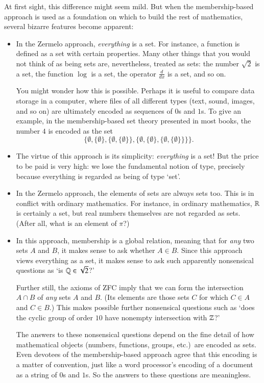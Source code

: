 At first sight, this difference might seem mild.  But when the
membership-based approach is used as a foundation on which to build the
rest of mathematics, several bizarre features become apparent:
%  
\begin{itemize}
\item 
In the Zermelo approach, \emph{everything} is a set.  For instance, a
function is defined as a set with certain properties.  Many other things
that you would not think of as being sets are, nevertheless, treated as
sets: the number $\sqrt{2}$ is a set, the function $\log$ is a set, the
operator $\frac{d}{dx}$ is a set, and so on.

You might wonder how this is possible.  Perhaps it is useful to compare
data storage in a computer,%
%
%
where files of all different types (text, sound, images, and so on) are
ultimately encoded as sequences of $0$s and $1$s.  To give an example, in
the membership-based set theory presented in most books, the number $4$ is
encoded as the set
\[
\{ \emptyset, \{ \emptyset \}, \{ \emptyset, \{ \emptyset \} \}, 
\{ \emptyset, \{ \emptyset \}, \{ \emptyset, \{ \emptyset \} \} \} \}.
\]

\item 
The virtue of this approach is its simplicity: \emph{everything} is a set!
But the price to be paid is very high: we lose the fundamental notion of
type, precisely because everything is regarded as being of type `set'.  

\item 
In the Zermelo approach, the elements of sets are always sets too.  This
is in conflict%
%
%
with ordinary mathematics.  For instance, in ordinary mathematics, $\mathbb{R}$
is certainly a set, but real numbers themselves are not regarded as sets.
(After all, what is an element of $\pi$?)

\item
In this approach, membership is a global relation, meaning that for
\emph{any} two sets $A$ and $B$, it makes sense to ask whether $A \in B$.
Since this approach views everything as a set, it makes sense to ask such
apparently nonsensical questions as `is $\mathbb{Q} \in \sqrt{2}$?'

Further still, the axioms of ZFC imply that we can form the intersection $A
\cap B$ of \emph{any} sets $A$ and $B$.  (Its elements are those sets $C$
for which $C \in A$ and $C \in B$.)  This makes possible further
nonsensical questions such as `does the cyclic group of order $10$ have
nonempty intersection with $\mathbb{Z}$?'

The answers to these nonsensical questions depend on the fine detail of how
mathematical objects (numbers, functions, groups, etc.)\ are encoded as
sets.  Even devotees of the membership-based approach agree that this
encoding is a matter of convention, just like a word processor's encoding
of a document as a string of $0$s and $1$s.  So the answers to these
questions are meaningless.
\end{itemize}

